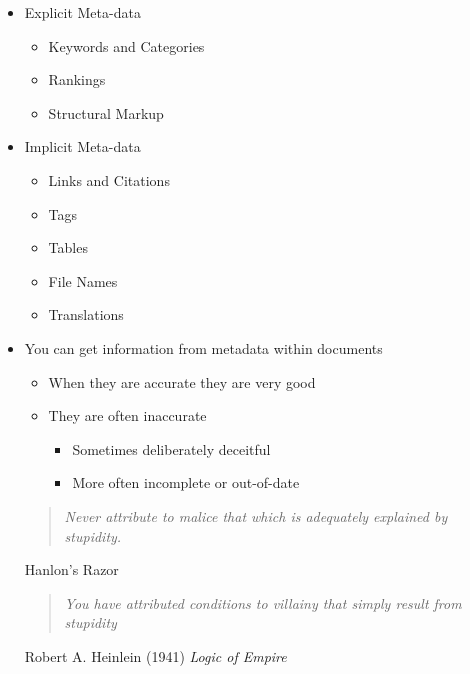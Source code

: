 \documentclass[a4paper,landscape,headrule,footrule,xetex]{foils}
\begin{document}


\maketitle


\begin{itemize}
\item Explicit Meta-data
  \begin{itemize}
  \item Keywords and Categories
  \item Rankings
  \item Structural Markup
  \end{itemize}
\item Implicit Meta-data
  \begin{itemize}
  \item Links and Citations
  \item Tags
  \item Tables
  \item File Names
  \item Translations
  \end{itemize}
\end{itemize}

\MyLogo{}
\begin{itemize}
\item You can get information from metadata within documents
  \begin{itemize}
  \item When they are accurate they are very good
  \item They are often inaccurate
    \begin{itemize}
    \item Sometimes deliberately deceitful
    \item More often incomplete or out-of-date
    \end{itemize}
  \end{itemize}
      \begin{quote} \itshape
    Never attribute to malice that which is adequately explained by stupidity.

     \end{quote} %
      \begin{flushright}
               Hanlon's Razor
      \end{flushright}
      \begin{quote} \itshape
        You have attributed conditions to villainy 
        that simply result from stupidity
      \end{quote}
       \begin{flushright}
         Robert A. Heinlein (1941) \textit{Logic of Empire}
       \end{flushright}
\end{itemize}
\end{document}

